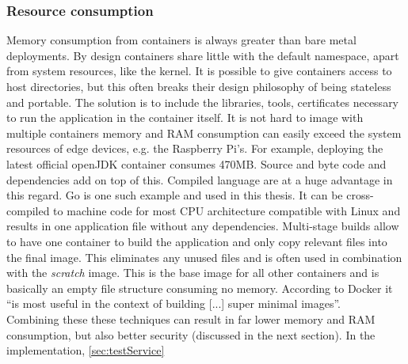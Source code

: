 \subsubsection{Resource consumption}
Memory consumption from containers is always greater than bare metal deployments. By design containers share little with the default namespace, apart from system resources, like the kernel. It is possible to give containers access to host directories, but this often breaks their design philosophy of being stateless and portable. The solution is to include the libraries, tools, certificates necessary to run the application in the container itself. It is not hard to image with multiple containers memory and RAM consumption can easily exceed the system resources of edge devices, e.g. the Raspberry Pi’s. For example, deploying the latest official openJDK container consumes 470MB. Source and byte code and dependencies add on top of this. Compiled language are at a huge advantage in this regard. Go is one such example and used in this thesis. It can be cross-compiled to machine code for most CPU architecture compatible with Linux and results in one application file without any dependencies. Multi-stage builds allow to have one container to build the application and only copy relevant files into the final image. This eliminates any unused files and is often used in combination with the \textit{scratch} image. This is the base image for all other containers and is basically an empty file structure consuming no memory. According to Docker it ``is most useful in the context of building [...] super minimal images''\cite{scratchImageDockerD65:online}.\\
Combining these these techniques can result in far lower memory and RAM consumption, but also better security (discussed in the next section). In the implementation, \cref{sec:testService} 